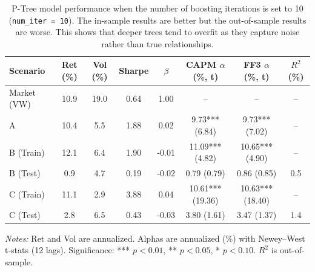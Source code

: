 \begin{table}[htbp]
\centering
\caption{P-Tree model performance when the number of boosting iterations is set to 10 (\texttt{num\_iter = 10}). The in-sample results are better but the out-of-sample results are worse. This shows that deeper trees tend to overfit as they capture noise rather than true relationships.}
\label{tab:performance_maxdepth}
\setlength{\tabcolsep}{3pt}
\renewcommand{\arraystretch}{1.0}
\small
\begin{tabular}{lccccccc}
\hline
Scenario & Ret (\%) & Vol (\%) & Sharpe & $\beta$ & CAPM $\alpha$ (\%, t) & FF3 $\alpha$ (\%, t) & $R^2$ (\%) \\
\hline
Market (VW) & 10.9 & 19.0 & 0.64 & 1.00 & -- & -- & -- \\
A & 10.4 & 5.5 & 1.88 & 0.02 & 9.73*** (6.84) & 9.73*** (7.02) & -- \\
B (Train) & 12.1 & 6.4 & 1.90 & -0.01 & 11.09*** (4.82) & 10.65*** (4.90) & -- \\
B (Test) & 0.9 & 4.7 & 0.19 & -0.02 & 0.79 (0.79) & 0.86 (0.85) & 0.5 \\
C (Train) & 11.1 & 2.9 & 3.88 & 0.04 & 10.61*** (19.36) & 10.63*** (18.40) & -- \\
C (Test) & 2.8 & 6.5 & 0.43 & -0.03 & 3.80 (1.61) & 3.47 (1.37) & 1.4 \\
\hline
\end{tabular}

\vspace{0.15cm}
\begin{minipage}{0.9\textwidth}
\footnotesize
\textit{Notes:} Ret and Vol are annualized. Alphas are annualized (\%) with Newey--West t-stats (12 lags). Significance: *** $p<0.01$, ** $p<0.05$, * $p<0.10$. $R^2$ is out-of-sample.
\end{minipage}
\end{table}
